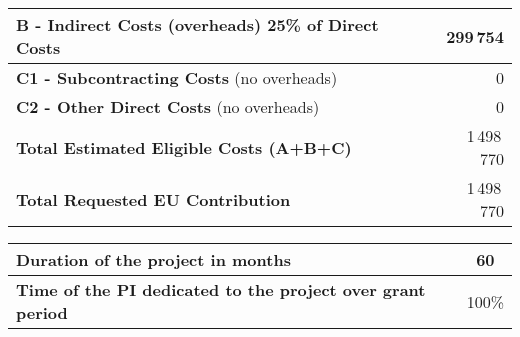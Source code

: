\begin{table}[!htb]
\begin{tabular}{|l|l|l|r|}
    \multicolumn{3}{|l|}{{\bfseries B - Indirect Costs (overheads)} 25\% of Direct Costs }  & 299\,754 \\ \hline
    \multicolumn{3}{|l|}{{\bfseries C1 - Subcontracting Costs} (no overheads)}  & 0  \\ \hline
    \multicolumn{3}{|l|}{{\bfseries C2 - Other Direct Costs} (no overheads)}  & 0 \\ \hline
    \multicolumn{3}{|l|}{{\bfseries Total Estimated Eligible Costs (A+B+C)}}  & 1\,498\,770 \\ \hline
    \multicolumn{3}{|l|}{{\bfseries Total Requested EU Contribution }}  &   1\,498\,770  \\ \hline
  \end{tabular}

\vspace{0.3cm}
  \begin{tabular}{|l|c|}\hline
     \bfseries Duration of the project in months & 60 \\ \hline
     \bfseries Time of the PI dedicated to the project over grant period & 100\% \\ \hline
  \end{tabular}
\end{table}